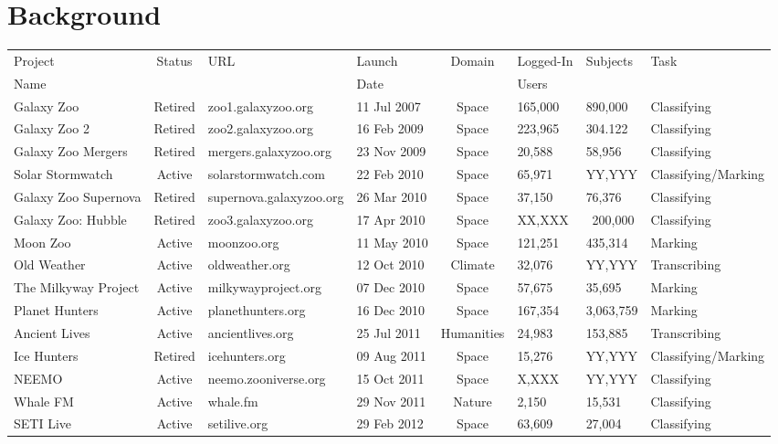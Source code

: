 \documentclass{sigchi}
\begin{document}
\section{Background}
\begin{table}
\begin{center}
\small
\begin{tabular}{lcllclll}
\hline
Project & Status & URL & Launch & Domain & Logged-In & Subjects & Task \\
Name &  &  & Date &  & Users &  &   \\
\hline
\hline
Galaxy Zoo & Retired & zoo1.galaxyzoo.org & 11 Jul 2007 & Space & 165,000 & 890,000 & Classifying \\
\hline
Galaxy Zoo 2 & Retired & zoo2.galaxyzoo.org & 16 Feb 2009 & Space & 223,965 & 304.122 & Classifying \\
Galaxy Zoo Mergers & Retired & mergers.galaxyzoo.org & 23 Nov 2009 & Space & 20,588 & 58,956 & Classifying \\
\hline
Solar Stormwatch & Active & solarstormwatch.com & 22 Feb 2010 & Space & 65,971 & YY,YYY & Classifying/Marking \\
Galaxy Zoo Supernova & Retired & supernova.galaxyzoo.org & 26 Mar 2010 & Space & 37,150 & 76,376 & Classifying \\
Galaxy Zoo: Hubble & Retired & zoo3.galaxyzoo.org & 17 Apr 2010 & Space & XX,XXX & ~200,000 & Classifying \\
Moon Zoo & Active & moonzoo.org & 11 May 2010 & Space & 121,251 & 435,314 & Marking \\
Old Weather & Active & oldweather.org & 12 Oct 2010 & Climate & 32,076 & YY,YYY & Transcribing \\
The Milkyway Project & Active & milkywayproject.org & 07 Dec 2010 & Space & 57,675 & 35,695 & Marking \\
Planet Hunters & Active & planethunters.org & 16 Dec 2010 & Space & 167,354 & 3,063,759 & Marking \\
\hline
Ancient Lives & Active & ancientlives.org & 25 Jul 2011 & Humanities & 24,983 & 153,885 & Transcribing \\
Ice Hunters & Retired & icehunters.org & 09 Aug 2011 & Space & 15,276 & YY,YYY & Classifying/Marking \\
NEEMO & Active & neemo.zooniverse.org & 15 Oct 2011 & Space & X,XXX & YY,YYY & Classifying \\
Whale FM & Active & whale.fm & 29 Nov 2011 & Nature & 2,150 & 15,531 & Classifying \\
\hline
SETI Live & Active & setilive.org & 29 Feb 2012 & Space & 63,609 & 27,004 & Classifying \\

\end{tabular}
\end{center}
\end{table}
\end{document}

